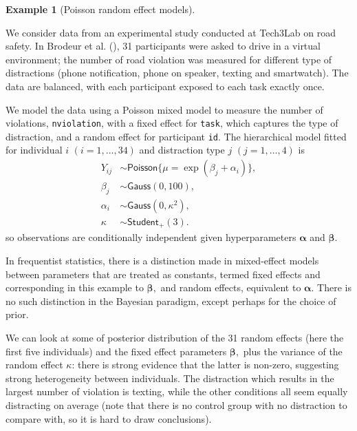 \documentclass[
  11pt,
  letterpaper,
]{scrbook}
\theoremstyle{definition}
\theoremstyle{plain}
\theoremstyle{plain}
\theoremstyle{definition}
\theoremstyle{definition}
\newtheorem{example}{Example}[chapter]
\theoremstyle{remark}
\begin{document}
\begin{example}[Poisson random effect
models]\protect\hypertarget{exm-randomeffects}{}\label{exm-randomeffects}

We consider data from an experimental study conducted at Tech3Lab on
road safety. In Brodeur et al. (), 31
participants were asked to drive in a virtual environment; the number of
road violation was measured for different type of distractions (phone
notification, phone on speaker, texting and smartwatch). The data are
balanced, with each participant exposed to each task exactly once.

We model the data using a Poisson mixed model to measure the number of
violations, \texttt{nviolation}, with a fixed effect for \texttt{task},
which captures the type of distraction, and a random effect for
participant \texttt{id}. The hierarchical model fitted for individual
\(i\) \((i=1, \ldots, 34)\) and distraction type \(j\)
\((j=1, \ldots, 4)\) is \begin{align*}
Y_{ij} &\sim \mathsf{Poisson}\{\mu = \exp(\beta_{j} + \alpha_i)\},\\
\beta_j &\sim \mathsf{Gauss}(0, 100), \\
\alpha_i &\sim \mathsf{Gauss}(0, \kappa^2), \\
\kappa &\sim \mathsf{Student}_{+}(3).
\end{align*} so observations are conditionally independent given
hyperparameters \(\boldsymbol{\alpha}\) and \(\boldsymbol{\beta}.\)

In frequentist statistics, there is a distinction made in mixed-effect
models between parameters that are treated as constants, termed fixed
effects and corresponding in this example to \(\boldsymbol{\beta},\) and
random effects, equivalent to \(\boldsymbol{\alpha}.\) There is no such
distinction in the Bayesian paradigm, except perhaps for the choice of
prior.

We can look at some of posterior distribution of the 31 random effects
(here the first five individuals) and the fixed effect parameters
\(\boldsymbol{\beta},\) plus the variance of the random effect
\(\kappa\): there is strong evidence that the latter is non-zero,
suggesting strong heterogeneity between individuals. The distraction
which results in the largest number of violation is texting, while the
other conditions all seem equally distracting on average (note that
there is no control group with no distraction to compare with, so it is
hard to draw conclusions).


\end{example}
\end{document}
